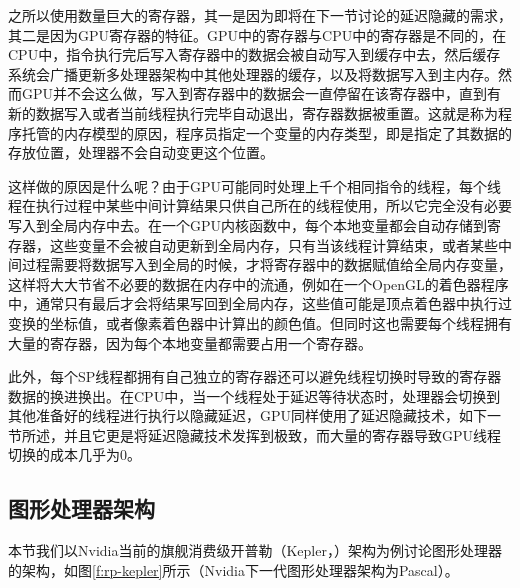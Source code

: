 之所以使用数量巨大的寄存器，其一是因为即将在下一节讨论的延迟隐藏的需求，其二是因为GPU寄存器的特征。GPU中的寄存器与CPU中的寄存器是不同的，在CPU中，指令执行完后写入寄存器中的数据会被自动写入到缓存中去，然后缓存系统会广播更新多处理器架构中其他处理器的缓存，以及将数据写入到主内存。然而GPU并不会这么做，写入到寄存器中的数据会一直停留在该寄存器中，直到有新的数据写入或者当前线程执行完毕自动退出，寄存器数据被重置。这就是称为程序托管的内存模型的原因，程序员指定一个变量的内存类型，即是指定了其数据的存放位置，处理器不会自动变更这个位置。

这样做的原因是什么呢？由于GPU可能同时处理上千个相同指令的线程，每个线程在执行过程中某些中间计算结果只供自己所在的线程使用，所以它完全没有必要写入到全局内存中去。在一个GPU内核函数中，每个本地变量都会自动存储到寄存器，这些变量不会被自动更新到全局内存，只有当该线程计算结束，或者某些中间过程需要将数据写入到全局的时候，才将寄存器中的数据赋值给全局内存变量，这样将大大节省不必要的数据在内存中的流通，例如在一个OpenGL的着色器程序中，通常只有最后才会将结果写回到全局内存，这些值可能是顶点着色器中执行过变换的坐标值，或者像素着色器中计算出的颜色值。但同时这也需要每个线程拥有大量的寄存器，因为每个本地变量都需要占用一个寄存器。

此外，每个SP线程都拥有自己独立的寄存器还可以避免线程切换时导致的寄存器数据的换进换出。在CPU中，当一个线程处于延迟等待状态时，处理器会切换到其他准备好的线程进行执行以隐藏延迟，GPU同样使用了延迟隐藏技术，如下一节所述，并且它更是将延迟隐藏技术发挥到极致，而大量的寄存器导致GPU线程切换的成本几乎为0。






\subsection{图形处理器架构}
本节我们以Nvidia当前的旗舰消费级开普勒（Kepler，\cite{a:NVIDIAsNextGenerationCUDATMComputeArchitecture:KeplerTMGK110/210}）架构为例讨论图形处理器的架构，如图\ref{f:rp-kepler}所示（Nvidia下一代图形处理器架构为Pascal\cite{a:PascalArchitectureWhitepaper}）。

